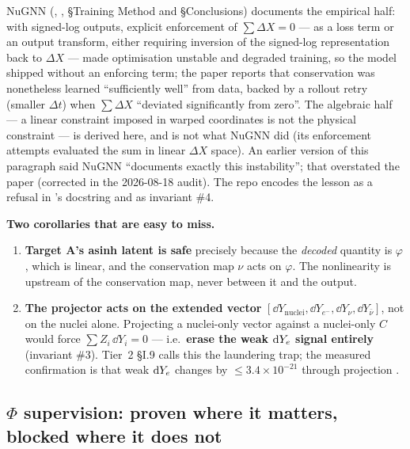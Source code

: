 NuGNN (\citealt{kim2026}, , \S Training Method and
\S Conclusions) documents the empirical half: with signed-log outputs, explicit
enforcement of $\sum\Delta X = 0$ --- as a loss term or an output transform,
either requiring inversion of the signed-log representation back to
$\Delta X$ --- made optimisation unstable and degraded training, so the model
shipped without an enforcing term; the paper reports that conservation was
nonetheless learned ``sufficiently well'' from data, backed by a rollout retry
(smaller $\Delta t$) when $\sum\Delta X$ ``deviated significantly from zero''.
The algebraic half --- a linear constraint imposed in warped coordinates is not
the physical constraint --- is derived here, and is not what NuGNN did (its
enforcement attempts evaluated the sum in linear $\Delta X$ space). An earlier
version of this paragraph said NuGNN ``documents exactly this instability'';
that overstated the paper (corrected in the 2026-08-18 audit). The repo encodes
the lesson as a refusal in 's docstring and as
invariant \#4.

\textbf{Two corollaries that are easy to miss.}

\begin{enumerate}
\item \textbf{Target A's asinh latent is safe} precisely because the
  \emph{decoded} quantity is $\varphi$, which is linear, and the conservation
  map $\nu$ acts on $\varphi$. The nonlinearity is upstream of the conservation
  map, never between it and the output.
\item \textbf{The projector acts on the extended vector}
  $[\dd Y_{\mathrm{nuclei}}, \dd Y_{e^-}, \dd Y_{\nu}, \dd Y_{\bar\nu}]$, not
  on the nuclei alone. Projecting a nuclei-only vector against a nuclei-only
  $C$ would force $\sum Z_i\,\dd Y_i = 0$ --- i.e.\ \textbf{erase the weak
  $\mathrm{d}Y_{e}$ signal entirely} (invariant \#3). Tier~2 \S I.9 calls this the
  laundering trap; the measured confirmation is that weak $\mathrm{d}Y_{e}$ changes by
  $\le 3.4 \times 10^{-21}$ through projection .
\end{enumerate}

\subsection{\texorpdfstring{$\Phi$}{Phi} supervision: proven where it matters, blocked where it does not}
\label{sec:phisupervision}

